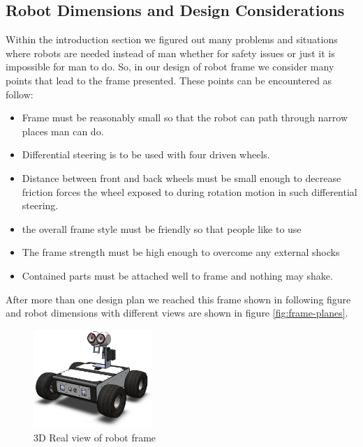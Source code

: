 \documentclass[12pt]{article}
\begin{document}
\subsection{Robot Dimensions and Design Considerations}
Within the introduction section we figured out many problems and situations where robots are needed instead of man whether for safety issues or just it is impossible for man to do. So, in our design of robot frame we consider many points that lead to the frame presented. These points can be encountered as follow:
\begin{itemize}
	\item Frame must be reasonably small so that the robot can path through narrow places man can do.
	\item Differential steering is to be used with four driven wheels.
	\item Distance between front and back wheels must be small enough to decrease friction forces the wheel exposed to during rotation motion in such differential steering. 
	\item the overall frame style must be friendly so that people like to use
	\item The frame strength must be high enough to overcome any external shocks
	\item Contained parts must be attached well to frame and nothing may shake.
\end{itemize}

After more than one design plan we reached this frame shown in following figure and robot dimensions with different views are shown in figure \ref{fig:frame-planes}.
\begin{figure}[H]
	\centering
	\includegraphics[width =0.4\textwidth]{Fig/Introduction.png}
	\caption{3D Real view of robot frame}
\end{figure}
\end{document}
